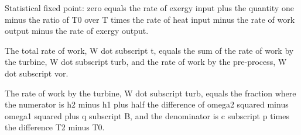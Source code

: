 Statistical fixed point: zero equals the rate of exergy input plus the quantity one minus the ratio of T0 over T times the rate of heat input minus the rate of work output minus the rate of exergy output.

The total rate of work, W dot subscript t, equals the sum of the rate of work by the turbine, W dot subscript turb, and the rate of work by the pre-process, W dot subscript vor.

The rate of work by the turbine, W dot subscript turb, equals the fraction where the numerator is h2 minus h1 plus half the difference of omega2 squared minus omega1 squared plus q subscript B, and the denominator is c subscript p times the difference T2 minus T0.